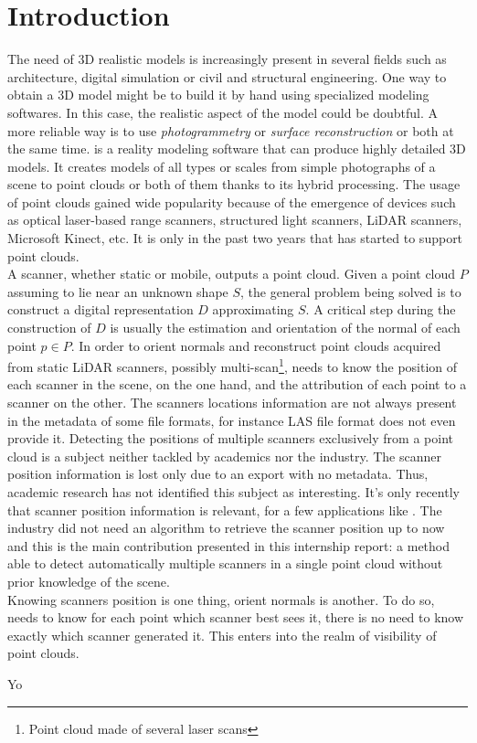 \chapter{Introduction}
\label{ch:introduction}

The need of 3D realistic models is increasingly present in several fields such as architecture, digital simulation or civil and structural engineering. One way to obtain a 3D model might be to build it by hand using specialized modeling softwares. In this case, the realistic aspect of the model could be doubtful. A more reliable way is to use \emph{photogrammetry} or \emph{surface reconstruction} or both at the same time.
\CC is a reality modeling software that can produce highly detailed 3D  models. It creates models of all types or scales from simple photographs of a scene to point clouds or both of them thanks to its hybrid processing. The usage of point clouds gained wide popularity because of the emergence of devices such as optical laser-based range scanners, structured light scanners, LiDAR scanners, Microsoft Kinect, etc. It is only in the past two years that \CC has started to support point clouds.\\
A scanner, whether static or mobile, outputs a point cloud. Given a point cloud $P$ assuming to lie near an unknown shape $S$, the general problem being solved is to construct a digital representation $D$ approximating $S$. A critical step during the construction of $D$ is usually the estimation and orientation of the normal of each point $p \in P$. In order to orient normals and  reconstruct point clouds acquired from static LiDAR scanners, possibly multi-scan\footnote{Point cloud made of several laser scans}, \CC needs to know the position of each scanner in the scene, on the one hand, and the attribution of each point to a scanner on the other. The scanners locations information are not always present in the metadata of some file formats, for instance LAS file format does not even provide it. Detecting the positions of multiple scanners exclusively from a point cloud is a subject neither tackled by academics nor the industry. The scanner position information is lost only due to an export with no metadata. Thus, academic research has not identified this subject as interesting. It’s only recently that scanner position information is relevant, for a few applications like \CC. The industry did not need an algorithm to retrieve the scanner position up to now and this is the main contribution presented in this internship report: a method able to detect automatically multiple scanners in a single point cloud without prior knowledge of the scene.\\
Knowing scanners position is one thing, orient normals is another. To do so, \CC needs to know for each point which scanner best sees it, there is no need to know exactly which scanner generated it. This enters into the realm of visibility of point clouds.


Yo \cite{vis1}